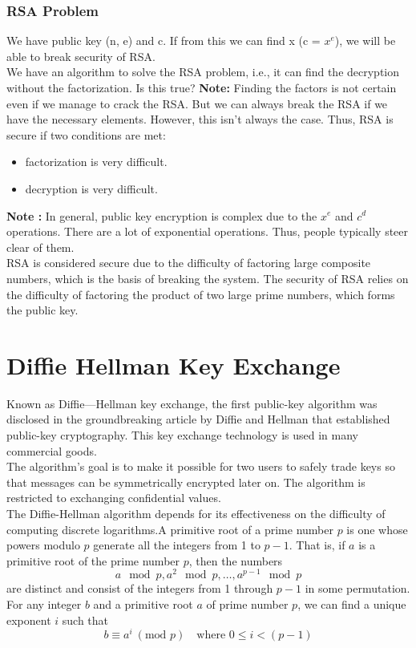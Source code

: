 \documentclass[11pt]{article}
\begin{document}
\subsubsection{RSA Problem}
We have public key (n, e) and c. If from this we can find x (c = $x^e$), we will be able to break security of RSA.\\
We have an algorithm to solve the RSA problem, i.e., it can find the decryption without the factorization. Is this true?
\textbf{Note:} Finding the factors is not certain even if we manage to crack the RSA. But we can always break the RSA if we have the necessary elements. However, this isn't always the case. Thus, RSA is secure if two conditions are met:
\begin{itemize}
    \item factorization is very difficult.
    \item decryption is very difficult.
\end{itemize}
\textbf{Note : } In general, public key encryption is complex due to the $x^e$ and $c^d$ operations. There are a lot of exponential operations. Thus, people typically steer clear of them.\\
RSA is considered secure due to the difficulty of factoring large composite numbers, which is the basis of breaking the system. The security of RSA relies on the difficulty of factoring the product of two large prime numbers, which forms the public key.
\section{Diffie  Hellman Key Exchange}
Known as Diffie—Hellman key exchange, the first public-key algorithm was disclosed in the groundbreaking article by Diffie and Hellman that established public-key cryptography. This key exchange technology is used in many commercial goods.\\
The algorithm's goal is to make it possible for two users to safely trade keys so that messages can be symmetrically encrypted later on. The algorithm is restricted to exchanging confidential values.\\
The Diffie-Hellman algorithm depends for its effectiveness on the difficulty of computing discrete logarithms.A primitive root of a prime number \(p\) is one whose powers modulo \(p\) generate all the integers from 1 to \(p - 1\). That is, if \(a\) is a primitive root of the prime number \(p\), then the numbers
\[
a \mod p, a^2 \mod p, \ldots, a^{p-1} \mod p
\]
are distinct and consist of the integers from 1 through \(p - 1\) in some permutation. For any integer \(b\) and a primitive root \(a\) of prime number \(p\), we can find a unique exponent \(i\) such that
\[
b \equiv a^i \ (\text{mod } p) \quad \text{where } 0 \leq i < (p - 1)
\]
\end{document}

